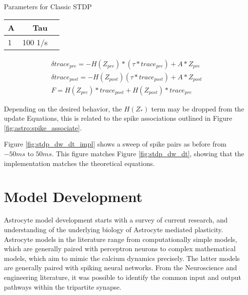 \begin{table}[!htp]\centering
  Parameters for Classic STDP \label{table:classic_stdp_params}
  \scriptsize
  \begin{tabular}{lrr}\toprule
    A &Tau \\\midrule
    1 &100 1/s \\
    \bottomrule
  \end{tabular}
\end{table}


\begin{align}
  \delta trace_{pre} = -H(Z_{pre})*(\tau * trace_{pre}) +
  A*Z_{pre} \label{eq:song_impl_pre} \\ 
  \delta trace_{post} = -H(Z_{post})(\tau * trace_{post}) +
  A*Z_{post} \label{eq:song_impl_post} \\
  F = H(Z_{pre}) * trace_{post} + H(Z_{post}) *
  trace_{pre} \label{eq:song_impl_dw}
\end{align}

Depending on the desired behavior, the $H(Z_*)$ term may be dropped from the
update Equations, this is related to the spike associations outlined in Figure
\ref{fig:astro:spike_associate}.

Figure \ref{fig:stdp_dw_dt_impl} shows a sweep of spike pairs as before from
$-50ms$ to $50ms$. This figure matches Figure \ref{fig:stdp_dw_dt}, showing that
the implementation matches the theoretical equations.




\section{Model Development}
Astrocyte model development starts with a survey of current research, and
understanding of the underlying biology of Astrocyte mediated
plasticity. Astrocyte models in the literature range from computationally simple
models, which are generally paired with perceptron neurons to complex
mathematical models, which aim to mimic the calcium dynamics precisely. The
latter models are generally paired with spiking neural networks. From the
Neuroscience and engineering literature, it was possible to identify the common
input and output pathways within the tripartite synapse. 

